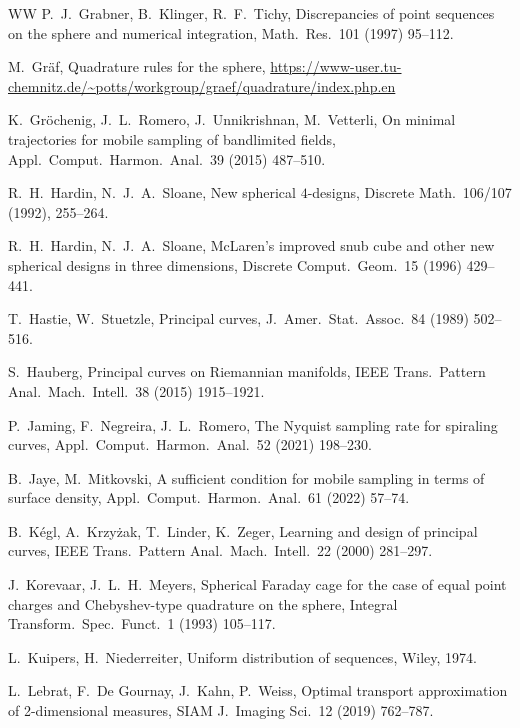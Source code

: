 \documentclass[12pt]{article}
\theoremstyle{plain}
\theoremstyle{definition}
\theoremstyle{remark}
\begin{document}
\begin{thebibliography}{WW}
P.\ J.\ Grabner, B.\ Klinger, R.\ F.\ Tichy,
Discrepancies of point sequences on the sphere and numerical integration,
Math.\ Res.\ 101 (1997) 95--112.

M.\ Gr\"af,
Quadrature rules for the sphere,
\url{https://www-user.tu-chemnitz.de/~potts/workgroup/graef/quadrature/index.php.en}


K.\ Gr\"ochenig, J.\ L.\ Romero, J.\ Unnikrishnan, M.\ Vetterli,
On minimal trajectories for mobile sampling of bandlimited fields,
Appl.\ Comput.\ Harmon.\ Anal.\ 39 (2015) 487--510.

R.\ H.\ Hardin, N.\ J.\ A.\ Sloane,
New spherical \(4\)-designs,
Discrete Math.\ 106/107 (1992), 255--264.

R.\ H.\ Hardin, N.\ J.\ A.\ Sloane,
McLaren's improved snub cube and other new spherical designs in three dimensions,
Discrete Comput.\ Geom.\ 15 (1996) 429--441.

T.\ Hastie, W.\ Stuetzle,
Principal curves,
J.\ Amer.\ Stat.\ Assoc.\ 84 (1989) 502--516.

S.\ Hauberg,
Principal curves on Riemannian manifolds,
IEEE Trans.\ Pattern Anal.\ Mach.\ Intell.\ 38 (2015) 1915--1921.

P.\ Jaming, F.\ Negreira, J.\ L.\ Romero,
The Nyquist sampling rate for spiraling curves,
Appl.\ Comput.\ Harmon.\ Anal.\ 52 (2021) 198--230.

B.\ Jaye, M.\ Mitkovski,
A sufficient condition for mobile sampling in terms of surface density,
Appl.\ Comput.\ Harmon.\ Anal.\ 61 (2022) 57--74.

B.\ K{\'e}gl, A.\ Krzy\.zak, T.\ Linder, K.\ Zeger,
Learning and design of principal curves,
IEEE Trans.\ Pattern Anal.\ Mach.\ Intell.\ 22 (2000) 281--297.

J.\ Korevaar, J.\ L.\ H.\ Meyers,
Spherical Faraday cage for the case of equal point charges and Chebyshev-type quadrature on the sphere,
Integral Transform.\ Spec.\ Funct.\ 1 (1993) 105--117.

L.\ Kuipers, H.\ Niederreiter,
Uniform distribution of sequences,
Wiley, 1974.

L.\ Lebrat, F.\ De Gournay, J.\ Kahn, P.\ Weiss,
Optimal transport approximation of 2-dimensional measures,
SIAM J.\ Imaging Sci.\ 12 (2019) 762--787.


\end{thebibliography}
\end{document}

